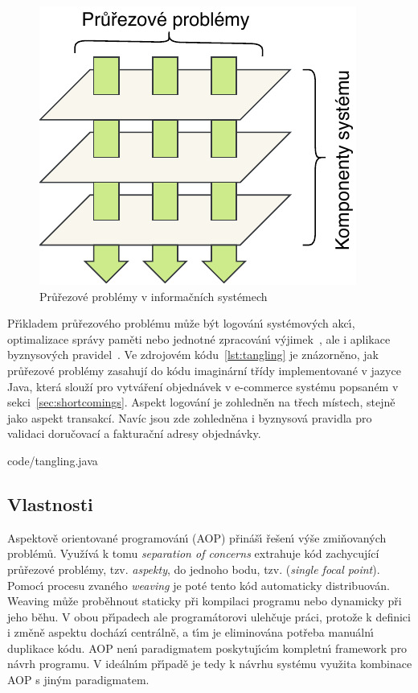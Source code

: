\begin{figure}[t]
    \centering
    \includegraphics[keepaspectratio=true, width=0.35\linewidth]{figures/cross-cutting.pdf}
    \caption{Průřezové problémy v informačních systémech}
    \label{fig:cross-cutting}
\end{figure}

Př\'{\i}kladem průřezového problému může b\'yt logován\'{\i}
systémov\'ych akc\'{\i}, optimalizace správy paměti
nebo jednotné zpracován\'{\i} v\'yjimek~\cite{kiczales1997aspect},
ale i aplikace byznysových pravidel~\cite{cemus2014aspect}.
Ve zdrojovém kódu~\ref{lst:tangling} je znázorněno, jak průřezové
problémy zasahují do kódu imaginární třídy implementované v
jazyce Java, která slouží pro vytváření objednávek v e-commerce
systému popsaném v sekci~\ref{sec:shortcomings}.
Aspekt logování je zohledněn na třech místech, stejně jako aspekt transakcí.
Navíc jsou zde zohledněna i byznysová pravidla pro validaci doručovací
a fakturační adresy objednávky.


{code/tangling.java}

\subsection{Vlastnosti}
Aspektově orientované programován\'{\i} (\gls{AOP}) přináš\'{\i} řešen\'{\i}
v\'yše zmiňovaných problémů. Využívá k tomu \textit{separation of concerns} \textendash\xspace
extrahuje kód zachycující průřezové problémy, tzv. \textit{aspekty}, do jednoho bodu, tzv. (\textit{single focal point}).
Pomoc\'{\i} procesu zvaného \textit{weaving} je poté tento kód automaticky distribuován.
Weaving může proběhnout staticky při kompilaci programu nebo dynamicky
při jeho běhu. V obou př\'{\i}padech ale programátorovi ulehčuje práci,
protože k definici i změně aspektu docház\'{\i} centrálně, a t\'{\i}m je eliminována
potřeba manuáln\'{\i} duplikace kódu. \gls{AOP} nen\'{\i} paradigmatem poskytuj\'{\i}c\'{\i}m
kompletn\'{\i} framework pro návrh programu. V ideáln\'{\i}m př\'{\i}padě je tedy k návrhu
systému využita kombinace \gls{AOP} s jin\'ym paradigmatem.

